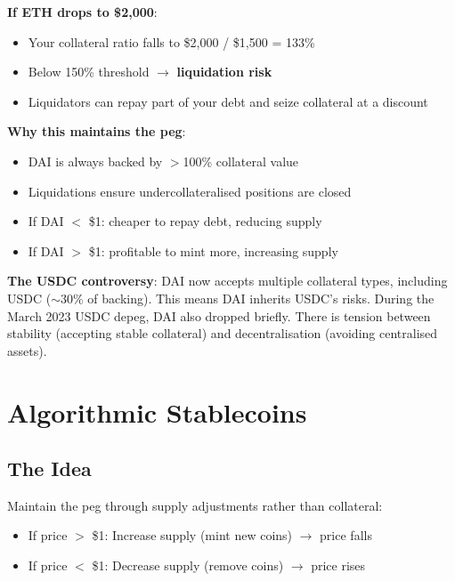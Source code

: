 \documentclass[11pt,a4paper]{article}
\newcommand{\keyword}[1]{\textbf{\textcolor{AccentOrange}{#1}}}
\begin{document}
\textbf{If ETH drops to \$2,000}:
\begin{itemize}
    \item Your collateral ratio falls to \$2,000 / \$1,500 = 133\%
    \item Below 150\% threshold $\rightarrow$ \keyword{liquidation risk}
    \item Liquidators can repay part of your debt and seize collateral at a discount
\end{itemize}

\textbf{Why this maintains the peg}:
\begin{itemize}
    \item DAI is always backed by $>$100\% collateral value
    \item Liquidations ensure undercollateralised positions are closed
    \item If DAI $<$ \$1: cheaper to repay debt, reducing supply
    \item If DAI $>$ \$1: profitable to mint more, increasing supply
\end{itemize}

\textbf{The USDC controversy}: DAI now accepts multiple collateral types, including USDC ($\sim$30\% of backing). This means DAI inherits USDC's risks. During the March 2023 USDC depeg, DAI also dropped briefly. There is tension between stability (accepting stable collateral) and decentralisation (avoiding centralised assets).

\section{Algorithmic Stablecoins}

\subsection{The Idea}

Maintain the peg through supply adjustments rather than collateral:
\begin{itemize}
    \item If price $>$ \$1: Increase supply (mint new coins) $\rightarrow$ price falls
    \item If price $<$ \$1: Decrease supply (remove coins) $\rightarrow$ price rises
\end{itemize}
\end{document}

